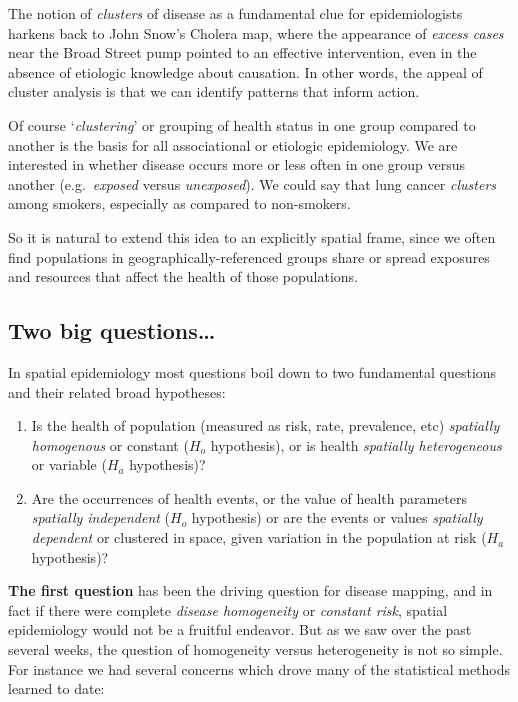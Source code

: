 \documentclass[
]{book}
\providecommand{\tightlist}{%
  \setlength{\itemsep}{0pt}\setlength{\parskip}{0pt}}
\begin{document}
The notion of \emph{clusters} of disease as a fundamental clue for epidemiologists harkens back to John Snow's Cholera map, where the appearance of \emph{excess cases} near the Broad Street pump pointed to an effective intervention, even in the absence of etiologic knowledge about causation. In other words, the appeal of cluster analysis is that we can identify patterns that inform action.

Of course `\emph{clustering}' or grouping of health status in one group compared to another is the basis for all associational or etiologic epidemiology. We are interested in whether disease occurs more or less often in one group versus another (e.g.~\emph{exposed} versus \emph{unexposed}). We could say that lung cancer \emph{clusters} among smokers, especially as compared to non-smokers.

So it is natural to extend this idea to an explicitly spatial frame, since we often find populations in geographically-referenced groups share or spread exposures and resources that affect the health of those populations.

\hypertarget{two-big-questions}{%
\subsection{Two big questions\ldots{}}\label{two-big-questions}}

In spatial epidemiology most questions boil down to two fundamental questions and their related broad hypotheses:

\begin{enumerate}
\def\labelenumi{\arabic{enumi}.}
\tightlist
\item
  Is the health of population (measured as risk, rate, prevalence, etc) \emph{spatially homogenous} or constant (\(H_o\) hypothesis), or is health \emph{spatially heterogeneous} or variable (\(H_a\) hypothesis)?
\item
  Are the occurrences of health events, or the value of health parameters \emph{spatially independent} (\(H_o\) hypothesis) or are the events or values \emph{spatially dependent} or clustered in space, given variation in the population at risk (\(H_a\) hypothesis)?
\end{enumerate}

\textbf{The first question} has been the driving question for disease mapping, and in fact if there were complete \emph{disease homogeneity} or \emph{constant risk}, spatial epidemiology would not be a fruitful endeavor. But as we saw over the past several weeks, the question of homogeneity versus heterogeneity is not so simple. For instance we had several concerns which drove many of the statistical methods learned to date:
\end{document}
